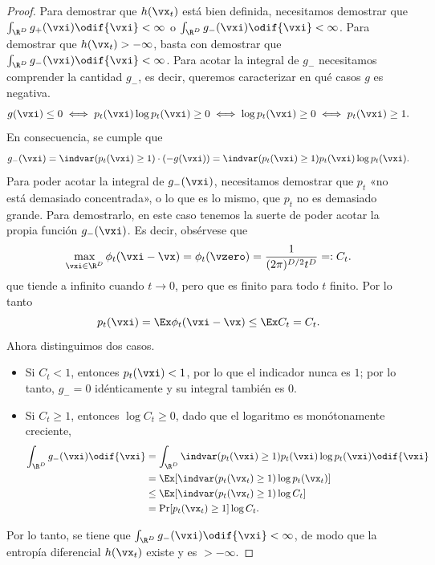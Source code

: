 \documentclass[../../book-main_es.tex]{subfiles}
\begin{document}
\begin{proof}
    Para demostrar que \(h(\vx_{t})\) está bien definida, necesitamos
    demostrar que \(\int_{\R^{D}}g_{+}(\vxi)\odif{\vxi} < \infty\) o
    \(\int_{\R^{D}}g_{-}(\vxi) \odif{\vxi} < \infty\). Para demostrar que
    \(h(\vx_{t}) > -\infty\), basta con demostrar que
    \(\int_{\R^{D}}g_{-}(\vxi)\odif{\vxi} < \infty\). Para acotar la
    integral de \(g_{-}\) necesitamos comprender la cantidad
    \(g_{-}\), es decir, queremos caracterizar en qué casos \(g\) es negativa.
    \begin{equation}
        g(\vxi) \leq 0 \iff p_{t}(\vxi)\log p_{t}(\vxi) \geq 0 \iff
        \log p_{t}(\vxi) \geq 0 \iff p_{t}(\vxi) \geq 1.
    \end{equation}
    En consecuencia, se cumple que
    \begin{equation}
        g_{-}(\vxi) = \indvar(p_{t}(\vxi) \geq 1)\cdot (-g(\vxi)) =
        \indvar(p_{t}(\vxi) \geq 1)p_{t}(\vxi)\log p_{t}(\vxi).
    \end{equation}
    Para poder acotar la integral de \(g_{-}(\vxi)\), necesitamos
    demostrar que \(p_{t}\) «no está demasiado concentrada», o lo que es lo mismo, que
    \(p_{t}\) no es demasiado grande. Para demostrarlo, en este caso tenemos
    la suerte de poder acotar la propia función \(g_{-}(\vxi)\).
    Es decir, obsérvese que
    \begin{equation}
        \max_{\vxi \in \R^{D}}\phi_{t}(\vxi - \vx) = \phi_{t}(\vzero)
        = \frac{1}{(2\pi)^{D/2}t^{D}} =: C_{t}.
    \end{equation}
    que tiende a infinito cuando \(t \to 0\), pero que es finito para todo \(t\) finito. Por lo tanto
    \begin{equation}
        p_{t}(\vxi) = \Ex \phi_{t}(\vxi - \vx) \leq \Ex C_{t} = C_{t}.
    \end{equation}
    Ahora distinguimos dos casos.
    \begin{itemize}
        \item Si \(C_{t} < 1\), entonces \(p_{t}(\vxi) < 1\), por lo que el
            indicador nunca es \(1\); por lo tanto, \(g_{-} = 0\) idénticamente
            y su integral también es \(0\).
        \item Si \(C_{t} \geq 1\), entonces \(\log C_{t} \geq 0\), 
            dado que el logaritmo es monótonamente creciente,
            \begin{align}
                \int_{\R^{D}}g_{-}(\vxi)\odif{\vxi}
                &= \int_{\R^{D}}\indvar(p_{t}(\vxi) \geq
                1)p_{t}(\vxi)\log p_{t}(\vxi)\odif{\vxi}  \\
                &= \Ex[\indvar(p_{t}(\vx_{t}) \geq 1)\log p_{t}(\vx_{t})]  \\
                &\leq \Ex[\indvar(p_{t}(\vx_{t}) \geq 1) \log C_{t}] \\
                &= \Pr[p_{t}(\vx_{t}) \geq 1]\log C_{t}.
            \end{align}
    \end{itemize}
    Por lo tanto, se tiene que \(\int_{\R^{D}}g_{-}(\vxi)\odif{\vxi} < \infty\),
    de modo que la entropía diferencial \(h(\vx_{t})\) existe y es \(> -\infty\).


\end{proof}
\end{document}
